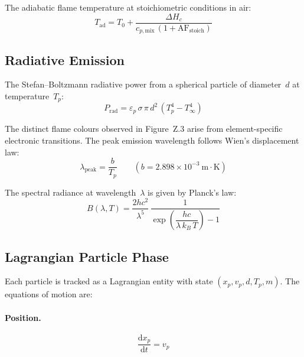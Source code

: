 \documentclass[11pt,a4paper]{article}
\begin{document}
The adiabatic flame temperature at stoichiometric conditions in air:
\begin{equation}\label{eq:T_ad}
  T_{\mathrm{ad}} = T_0
    + \frac{\Delta H_c}{c_{p,\mathrm{mix}}\,(1 + \mathrm{AF}_{\mathrm{stoich}})}
\end{equation}

\subsection{Radiative Emission}

The Stefan--Boltzmann radiative power from a spherical particle of
diameter~$d$ at temperature~$T_p$:
\begin{equation}\label{eq:P_rad}
  P_{\mathrm{rad}} = \varepsilon_p\,\sigma\,\pi\,d^2\,
    \left(T_p^4 - T_\infty^4\right)
\end{equation}

The distinct flame colours observed in Figure~Z.3 arise from
element-specific electronic transitions.  The peak emission wavelength
follows Wien's displacement law:
\begin{equation}\label{eq:wien}
  \lambda_{\mathrm{peak}} = \frac{b}{T_p}
  \qquad (b = 2.898 \times 10^{-3}~\mathrm{m \cdot K})
\end{equation}

The spectral radiance at wavelength~$\lambda$ is given by Planck's law:
\begin{equation}\label{eq:planck}
  B(\lambda, T) = \frac{2hc^2}{\lambda^5}
    \,\frac{1}{\exp\!\left(\dfrac{hc}{\lambda\,k_B\,T}\right) - 1}
\end{equation}

\subsection{Lagrangian Particle Phase}

Each particle is tracked as a Lagrangian entity with state
$(x_p, v_p, d, T_p, m)$.  The equations of motion are:

\paragraph{Position.}
\begin{equation}\label{eq:dxp_dt}
  \frac{\mathrm{d}x_p}{\mathrm{d}t} = v_p
\end{equation}
\end{document}
